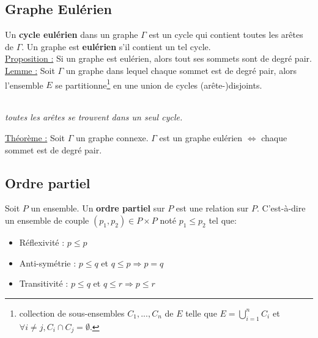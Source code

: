 \documentclass[11pt]{article}
\begin{document}
	\subsection{Graphe Eulérien}
		Un \textbf{cycle eulérien} dans un graphe $\Gamma$ est un cycle qui contient toutes les arêtes de $\Gamma$. Un graphe est \textbf{eulérien} s'il contient un tel cycle.\\
		
		\underline{Proposition :} Si un graphe est eulérien, alors tout ses sommets sont de degré pair.\\
		
		\underline{Lemme :} Soit $\Gamma$ un graphe dans lequel chaque sommet est de degré pair, alors l'ensemble $E$ se partitionne\footnote{collection de sous-ensembles $C_1, ..., C_n$ de $E$ telle que $E=\displaystyle\bigcup^n_{i=1} C_i$ et $\forall i \neq j, C_i \cap C_j = \emptyset$.} en une union de cycles (arête-)disjoints.\\
		\begin{center}
			 \\
				\textit{toutes les arêtes se trouvent dans un seul cycle.}
			\end{center} 
			
	\underline{Théorème :}  Soit $\Gamma$ un graphe connexe. $\Gamma$ est un graphe eulérien $\Leftrightarrow$ chaque sommet est de degré pair.
	
	\subsection{Ordre partiel}
		Soit $P$ un ensemble. Un \textbf{ordre partiel} sur $P$ est une relation sur $P$. C'est-à-dire un ensemble de couple $(p_1,p_2) \in P \times P$ noté $p_1 \leq p_2$ tel que:
		\begin{itemize}
			\item Réflexivité : $p \leq p$
			\item Anti-symétrie : $p \leq q$ et $q \leq p \Rightarrow p = q$
			\item Transitivité : $p \leq q$ et $q \leq r \Rightarrow p \leq r$
		\end{itemize}
\end{document}
